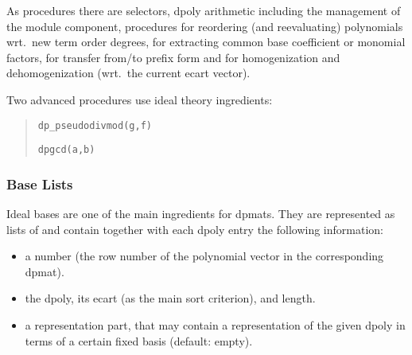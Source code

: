 As procedures there are selectors, dpoly arithmetic including the management
of the module component, procedures for reordering (and reevaluating)
polynomials wrt.\ new term order degrees, for extracting common base
coefficient or monomial factors, for transfer from/to prefix form and for
homogenization and dehomogenization (wrt.\ the current ecart vector).

Two advanced procedures use ideal theory ingredients:
\begin{quote}
\verb|dp_pseudodivmod(g,f)|


\verb|dpgcd(a,b)| 

\end{quote}


\subsubsection{Base Lists}

Ideal bases are one of the main ingredients for dpmats. They are
represented as lists of  and contain together with
each dpoly entry the following information:
\begin{itemize}
\item a number (the row number of the polynomial vector in the
corresponding dpmat).

\item the dpoly, its ecart (as the main sort criterion), and length.

\item a representation part, that may contain a representation of the
given dpoly in terms of a certain fixed basis (default: empty).
\end{itemize}

